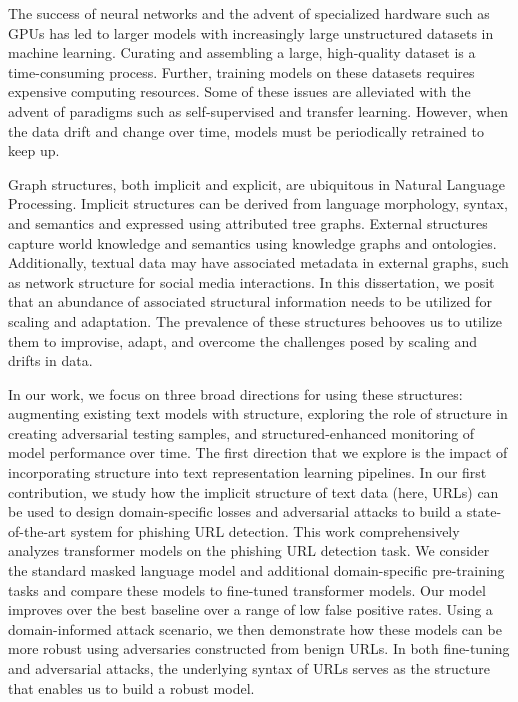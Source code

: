 The success of neural networks and the advent of specialized hardware such as GPUs has led to larger models with increasingly large unstructured datasets in machine learning.
Curating and assembling a large, high-quality dataset is a time-consuming process.
Further, training models on these datasets requires expensive computing resources.
Some of these issues are alleviated with the advent of paradigms such as self-supervised and transfer learning.
However, when the data drift and change over time,
models must be periodically retrained to keep up.

Graph structures, both implicit and explicit, are ubiquitous in Natural Language Processing.
Implicit structures can be derived from language morphology, syntax, and semantics and expressed using attributed tree graphs.
External structures capture world knowledge and semantics using knowledge graphs and ontologies.
Additionally, textual data may have associated metadata in external graphs, such as network structure for social media interactions.
In this dissertation, we posit that an abundance of associated structural information needs to be utilized for scaling and adaptation.
The prevalence of these structures behooves us to utilize them to improvise, adapt, and overcome the challenges posed by scaling and drifts in data.

In our work, we focus on three broad directions for using these structures: augmenting existing text models with structure, exploring the role of structure in creating adversarial testing samples, and structured-enhanced monitoring of model performance over time.
The first direction that we explore is the impact of incorporating structure into text representation learning pipelines.
In our first contribution, we study how the implicit structure of text data (here, URLs) can be used to design domain-specific losses and adversarial attacks to build a state-of-the-art system for phishing URL detection.
This work comprehensively analyzes transformer models on the phishing URL detection task.
We consider the standard masked language model and additional domain-specific pre-training tasks and compare these models to fine-tuned transformer models.
Our model improves over the best baseline over a range of low false positive rates.
Using a domain-informed attack scenario, we then demonstrate how these models can be more robust using adversaries constructed from benign URLs. 
In both fine-tuning and adversarial attacks, the underlying syntax of URLs serves as the structure that enables us to build a robust model.

